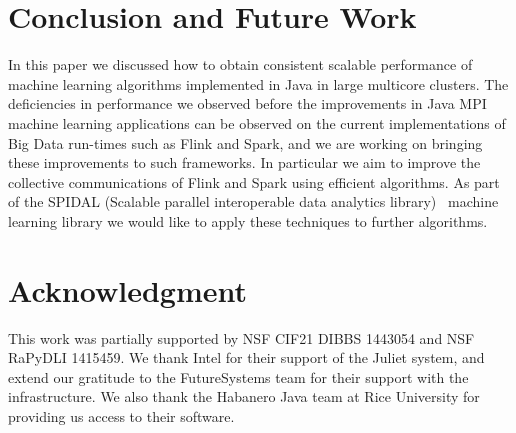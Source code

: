 \documentclass[10pt, conference, compsocconf]{IEEEtran}
\begin{document}
\section{Conclusion and Future Work} \label{sec:conclusion}
In this paper we discussed how to obtain consistent scalable performance of machine learning algorithms implemented in Java in large multicore clusters. The deficiencies in performance we observed before the improvements in Java \ac{MPI} machine learning applications can be observed on the current implementations of Big Data run-times such as Flink and Spark, and we are working on bringing these improvements to such frameworks. In particular we aim to improve the collective communications of Flink and Spark using efficient algorithms. As part of the SPIDAL (Scalable parallel interoperable data analytics library)~\cite{spidal-project} machine learning library we would like to apply these techniques to further algorithms.

\section*{Acknowledgment}
This work was partially supported by NSF CIF21 DIBBS 1443054 and NSF RaPyDLI 1415459. We thank Intel  for their support of the Juliet system, and extend our gratitude to the FutureSystems team for their support with the infrastructure. We also thank the Habanero Java team at Rice University for providing us access to their software. 



%
%
%


% 

\balance
{}



\end{document}
